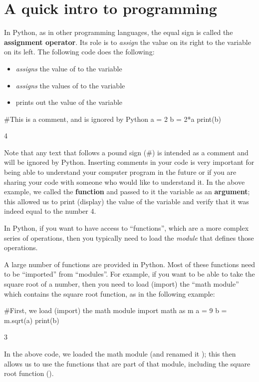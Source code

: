 \section{A quick intro to programming}
In Python, as in other programming languages, the equal sign is called the \textbf{assignment operator}. Its role is to \textit{assign} the value on its right to the variable on its left. The following code does the following:
\begin{itemize}
\item \textit{assigns} the value of  to the variable 
\item \textit{assigns} the values of  to the variable 
\item prints out the value of the variable 
\end{itemize}
\vspace{0.25cm}
\begin{python}[caption=Declaring variables in Python] 
#This is a comment, and is ignored by Python
a = 2 
b = 2*a
print(b)
\end{python}
\begin{poutput}
4
\end{poutput}
Note that any text that follows a pound sign (\#) is intended as a comment and will be ignored by Python. Inserting comments in your code is very important for being able to understand your computer program in the future or if you are sharing your code with someone who would like to understand it. In the above example, we called the  \textbf{function} and passed to it the variable  as an \textbf{argument}; this allowed us to print (display) the value of the variable  and verify that it was indeed equal to the number 4.


In Python, if you want to have access to ``functions'', which are a more complex series of operations, then you typically need to load the \textit{module} that defines those operations. 

A large number of functions are provided in Python. Most of these functions need to be ``imported'' from ``modules''. For example, if you want to be able to take the square root of a number, then you need to load (import) the ``math module'' which contains the square root function, as in the following example:
\begin{python}[caption=Using functions from modules] 
#First, we load (import) the math module
import math as m
a = 9
b = m.sqrt(a)
print(b)
\end{python}
\begin{poutput}
3
\end{poutput}
In the above code, we loaded the math module (and renamed it ); this then allows us to use the functions that are part of that module, including the square root function ().

